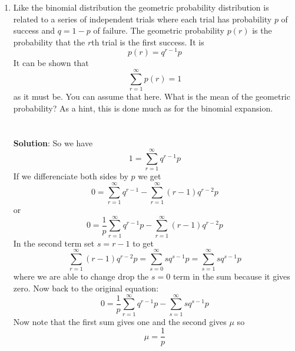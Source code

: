 \documentclass[11pt,a4paper]{scrartcl}
\begin{document}
\begin{enumerate}
\item Like the binomial distribution the geometric probability
  distribution is related to a series of independent trials where each
  trial has probability $p$ of success and $q=1-p$ of failure. The
  geometric probability $p(r)$ is the probability that the $r$th trial
  is the first success. It is
\begin{equation}
p(r)=q^{r-1}p
\end{equation}
It can be shown that 
\begin{equation}
\sum_{r=1}^\infty p(r)=1
\end{equation}
as it must be. You can assume that here. What is the mean of the geometric probability? As a hint, this is done much as for the binomial expansion.
\\ \\ \\ 
\textbf{Solution}: So we have
\begin{equation}
1=\sum_{r=1}^\infty q^{r-1}p
\end{equation}
If we differenciate both sides by $p$ we get
\begin{equation}
0=\sum_{r=1}^\infty q^{r-1}-\sum_{r=1}^\infty (r-1)q^{r-2}p
\end{equation}
or
\begin{equation}
0=\frac{1}{p}\sum_{r=1}^\infty q^{r-1}p-\sum_{r=1}^\infty (r-1)q^{r-2}p
\end{equation}
In the second term set $s=r-1$ to get 
\begin{equation}
\sum_{r=1}^\infty (r-1)q^{r-2}p=\sum_{s=0}^\infty sq^{s-1}p=\sum_{s=1}^\infty sq^{s-1}p
\end{equation}
where we are able to change drop the $s=0$ term in the sum because it gives zero. Now back to the original equation:
\begin{equation}
0=\frac{1}{p}\sum_{r=1}^\infty q^{r-1}p-\sum_{s=1}^\infty sq^{s-1}p
\end{equation}
Now note that the first sum gives one and the second gives $\mu$ so
\begin{equation}
\mu=\frac{1}{p}
\end{equation}


\end{enumerate}
\end{document}

